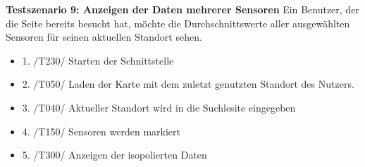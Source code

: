 \textbf{Testszenario 9: Anzeigen der Daten mehrerer Sensoren}
\newline
Ein Benutzer, der die Seite bereits besucht hat, möchte die Durchschnittswerte aller ausgewählten Sensoren für seinen aktuellen Standort sehen.
\begin{itemize} [noitemsep]
    \item 1. /T230/ Starten der Schnittstelle
    \item 2. /T050/ Laden der Karte mit dem zuletzt genutzten Standort des Nutzers.
    \item 3. /T040/ Aktueller Standort wird in die Suchlesite eingegeben
    \item 4. /T150/ Sensoren werden markiert
    \item 5. /T300/ Anzeigen der isopolierten Daten
\end{itemize}